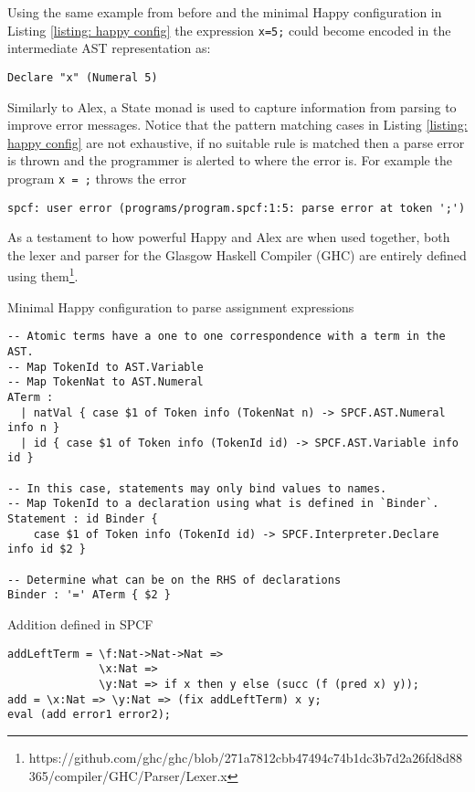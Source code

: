 \documentclass[12pt,a4paper]{report}
\theoremstyle{definition}
\theoremstyle{remark}
\begin{document}
Using the same example from before and the minimal Happy configuration in Listing \ref{listing: happy config} the expression \lstinline{x=5;} could become encoded in the intermediate AST representation as: 
\begin{verbatim}
Declare "x" (Numeral 5)
\end{verbatim}

Similarly to Alex, a State monad is used to capture information from parsing to improve error messages. Notice that the pattern matching cases in Listing \ref{listing: happy config} are not exhaustive, if no suitable rule is matched then a parse error is thrown and the programmer is alerted to where the error is. For example the program \lstinline{x = ;} throws the error
\begin{verbatim}
spcf: user error (programs/program.spcf:1:5: parse error at token ';')
\end{verbatim}

As a testament to how powerful Happy and Alex are when used together, both the lexer and parser for the Glasgow Haskell Compiler (GHC) are entirely defined using them\footnote{https://github.com/ghc/ghc/blob/271a7812cbb47494c74b1dc3b7d2a26fd8d88365/compiler/GHC/Parser/Lexer.x}. 

\begin{listing}
\caption{Minimal Happy configuration to parse assignment expressions}
\label{listing: happy config}
\begin{verbatim}
-- Atomic terms have a one to one correspondence with a term in the AST.
-- Map TokenId to AST.Variable
-- Map TokenNat to AST.Numeral 
ATerm :
  | natVal { case $1 of Token info (TokenNat n) -> SPCF.AST.Numeral info n }
  | id { case $1 of Token info (TokenId id) -> SPCF.AST.Variable info id }

-- In this case, statements may only bind values to names.
-- Map TokenId to a declaration using what is defined in `Binder`.
Statement : id Binder { 
    case $1 of Token info (TokenId id) -> SPCF.Interpreter.Declare info id $2 }

-- Determine what can be on the RHS of declarations
Binder : '=' ATerm { $2 }
\end{verbatim}
\end{listing}

\begin{listing}
\caption{Addition defined in SPCF}
\begin{verbatim}
addLeftTerm = \f:Nat->Nat->Nat => 
              \x:Nat => 
              \y:Nat => if x then y else (succ (f (pred x) y));
add = \x:Nat => \y:Nat => (fix addLeftTerm) x y;
eval (add error1 error2);
\end{verbatim}
\end{listing}
\end{document}
